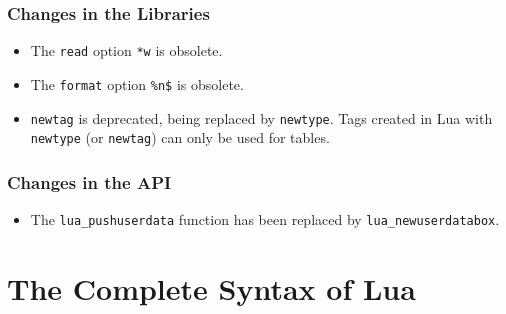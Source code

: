 \documentclass[11pt,twoside,draft]{article}
\renewcommand{\Or}{$|$ }
\begin{document}
\subsubsection*{Changes in the Libraries}
\begin{itemize}

\item
The \verb|read| option \verb|*w| is obsolete.

\item
The \verb|format| option \verb|%n$| is obsolete.

\item
\verb|newtag| is deprecated, being replaced by \verb|newtype|.
Tags created in Lua with \verb|newtype| (or \verb|newtag|) can only
be used for tables.

\end{itemize}


\subsubsection*{Changes in the API}
\begin{itemize}

\item
The \verb|lua_pushuserdata| function has been replaced by
\verb|lua_newuserdatabox|.

\end{itemize}

\newpage
\section*{The Complete Syntax of Lua} \label{BNF}


\renewenvironment{Produc}{\vspace{0.8ex}\par\noindent\hspace{3ex}\it\begin{tabular}{rrl}}{\end{tabular}\vspace{0.8ex}\par\noindent}

\renewcommand{\OrNL}{\\ & \Or & }
\newcommand{\Nter}[1]{#1}

\end{document}
